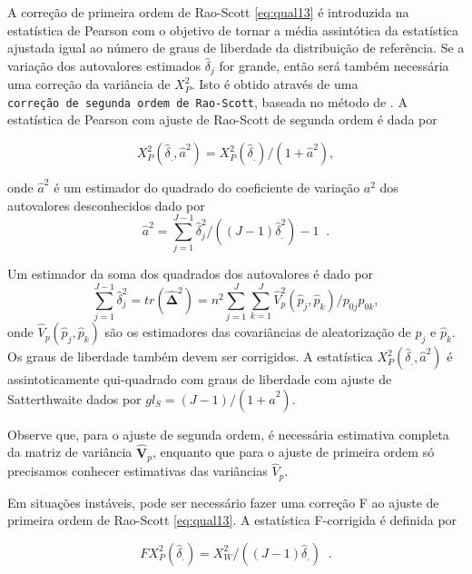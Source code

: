 \documentclass[]{book}
\numberwithin{example}{chapter}
\numberwithin{remark}{chapter}
\numberwithin{definition}{chapter}
\begin{document}
A correção de primeira ordem de Rao-Scott \eqref{eq:qual13} é introduzida
na estatística de Pearson com o objetivo de tornar a média assintótica
da estatística ajustada igual ao número de graus de liberdade da
distribuição de referência. Se a variação dos autovalores estimados
\(\hat{\delta}_{j}\) for grande, então será também necessária uma
correção da variância de \(X_{P}^{2}\). Isto é obtido através de uma
\texttt{correção\ de\ segunda\ ordem\ de\ Rao-Scott}, baseada no método
de \citep{sat}. A estatística de Pearson com ajuste de Rao-Scott de
segunda ordem é dada por

\begin{equation}
X_{P}^{2}\left( \hat{\delta}_{.},\hat{a}^{2}\right) =
X_{P}^{2}\left( \hat{\delta}_{.}\right) /\left( 1+\hat{a}^{2}\right) , 
 \label{eq:qual14}
\end{equation}

onde \(\hat{a}^{2}\) é um estimador do quadrado do coeficiente de
variação \(a^{2}\) dos autovalores desconhecidos dado por \[
\hat{a}^{2}=\sum_{j=1}^{J-1}\hat{\delta}_{j}^{2}/\left( \left( J-1\right)
 \hat{\delta}_{.}^{2}\right) -1\;\;. 
\]

Um estimador da soma dos quadrados dos autovalores é dado por \[
\sum_{j=1}^{J-1}\hat{\delta}_{j}^{2}=tr\left( \mathbf{\hat{\Delta}}^{2}\right) =n^{2}\sum\limits_{j=1}^{J}\sum\limits_{k=1}^{J}
\hat{V}_{p}^{2}\left( \hat{p}_{j},\hat{p}_{k}\right) /p_{0j}p_{0k}, 
\] onde \(\hat{V}_{p}\left( \hat{p}_{j},\hat{p}_{k}\right)\) são os
estimadores das covariâncias de aleatorização de \(\hat{p}_{j}\) e
\(\hat{p}_{k}\). Os graus de liberdade também devem ser corrigidos. A
estatística \(X_{P}^{2}\left( \hat{\delta}_{.},\hat{a}^{2}\right)\) é
assintoticamente qui-quadrado com graus de liberdade com ajuste de
Satterthwaite dados por
\(gl_{S}=\left( J-1\right) /\left( 1+\hat{a}^{2}\right)\).

Observe que, para o ajuste de segunda ordem, é necessária estimativa
completa da matriz de variância \(\mathbf{\hat{V}}_{p}\), enquanto que
para o ajuste de primeira ordem só precisamos conhecer estimativas das
variâncias \(\hat{V}_{p}\).

Em situações instáveis, pode ser necessário fazer uma correção F ao
ajuste de primeira ordem de Rao-Scott \eqref{eq:qual13}. A estatística
F-corrigida é definida por

\begin{equation}
FX_{P}^{2}\left( \hat{\delta}_{.}\right) =X_{W}^{2}/\left( \left( J-1\right) 
\hat{\delta}_{.}\right) \;\;.  
\label{eq:qual15}
\end{equation}
\end{document}
